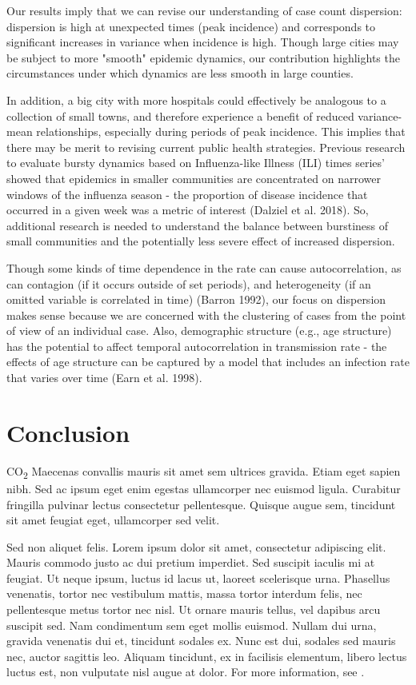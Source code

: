 \documentclass[10pt,letterpaper]{article}
\begin{document}
Our results imply that we can revise our understanding of case count dispersion: dispersion is high at unexpected times (peak incidence) and corresponds to significant increases in variance when incidence is high. Though large cities may be subject to more "smooth" epidemic dynamics, our contribution highlights the circumstances under which dynamics are less smooth in large counties. 

In addition, a big city with more hospitals could effectively be analogous to a collection of small towns, and therefore experience a benefit of reduced variance-mean relationships, especially during periods of peak incidence.
This implies that there may be merit to revising current public health strategies. Previous research to evaluate bursty dynamics based on Influenza-like Illness (ILI) times series’ showed that epidemics in smaller communities are concentrated on narrower windows of the influenza season - the proportion of disease incidence that occurred in a given week was a metric of interest (Dalziel et al. 2018). So, additional research is needed to understand the balance between burstiness of small communities and the potentially less severe effect of increased dispersion.

Though some kinds of time dependence in the rate can cause autocorrelation, as can contagion (if it occurs outside of set periods), and heterogeneity (if an omitted variable is correlated in time) (Barron 1992), our focus on dispersion makes sense because we are concerned with the clustering of cases from the point of view of an individual case. Also, demographic structure (e.g., age structure) has the potential to affect temporal autocorrelation in transmission rate - the effects of age structure can be captured by a model that includes an infection rate that varies over time (Earn et al. 1998). 

\section*{Conclusion}

CO\textsubscript{2} Maecenas convallis mauris sit amet sem ultrices gravida. Etiam eget sapien nibh. Sed ac ipsum eget enim egestas ullamcorper nec euismod ligula. Curabitur fringilla pulvinar lectus consectetur pellentesque. Quisque augue sem, tincidunt sit amet feugiat eget, ullamcorper sed velit. 

Sed non aliquet felis. Lorem ipsum dolor sit amet, consectetur adipiscing elit. Mauris commodo justo ac dui pretium imperdiet. Sed suscipit iaculis mi at feugiat. Ut neque ipsum, luctus id lacus ut, laoreet scelerisque urna. Phasellus venenatis, tortor nec vestibulum mattis, massa tortor interdum felis, nec pellentesque metus tortor nec nisl. Ut ornare mauris tellus, vel dapibus arcu suscipit sed. Nam condimentum sem eget mollis euismod. Nullam dui urna, gravida venenatis dui et, tincidunt sodales ex. Nunc est dui, sodales sed mauris nec, auctor sagittis leo. Aliquam tincidunt, ex in facilisis elementum, libero lectus luctus est, non vulputate nisl augue at dolor. For more information, see .
\end{document}
